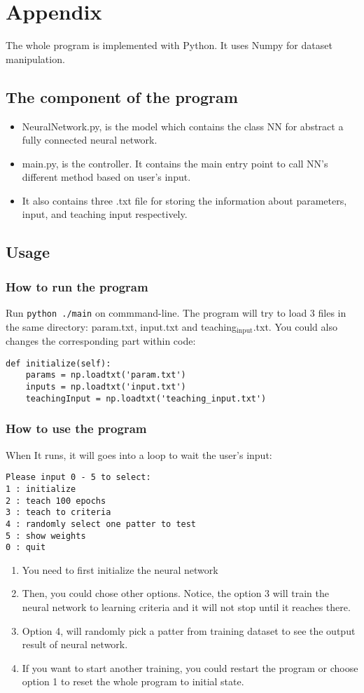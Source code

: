 \documentclass[11pt]{article}
\begin{document}
\section{Appendix}
\label{sec-5}
The whole program is implemented with Python. It uses Numpy for dataset manipulation.
\subsection{The component of the program}
\label{sec-5-1}
\begin{itemize}
\item NeuralNetwork.py, is the model which contains the class NN for abstract a fully connected neural network.
\item main.py, is the controller. It contains the main entry point to call NN's different method based on user's input.
\item It also contains three .txt file for storing the information about parameters, input, and teaching input respectively.
\end{itemize}
\subsection{Usage}
\label{sec-5-2}
\subsubsection{How to run the program}
\label{sec-5-2-1}
Run \texttt{python ./main} on commmand-line.
The program will try to load 3 files in the same directory: param.txt, input.txt and teaching$_{\text{input}}$.txt. You could also changes the corresponding part within code:
\begin{verbatim}
def initialize(self):
    params = np.loadtxt('param.txt')
    inputs = np.loadtxt('input.txt')
    teachingInput = np.loadtxt('teaching_input.txt')
\end{verbatim}
\subsubsection{How to use the program}
\label{sec-5-2-2}
When It runs, it will goes into a loop to wait the user's input:
\begin{verbatim}
Please input 0 - 5 to select:
1 : initialize
2 : teach 100 epochs
3 : teach to criteria
4 : randomly select one patter to test
5 : show weights
0 : quit
\end{verbatim}

\begin{enumerate}
\item You need to first initialize the neural network
\item Then, you could chose other options. Notice, the option 3 will train the neural network to learning criteria and it will not stop until it reaches there.
\item Option 4, will randomly pick a patter from training dataset to see the output result of neural network.
\item If you want to start another training, you could restart the program or choose option 1 to reset the whole program to initial state.
\end{enumerate}
\end{document}
